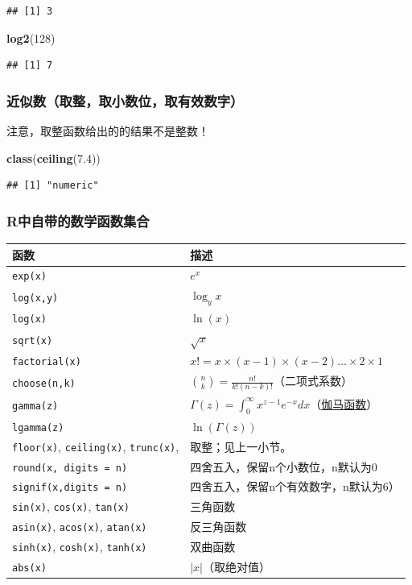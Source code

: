 \documentclass[]{book}
\newenvironment{Shaded}{\begin{snugshade}}{\end{snugshade}}
\newcommand{\DecValTok}[1]{\textcolor[rgb]{0.00,0.00,0.81}{#1}}
\newcommand{\FloatTok}[1]{\textcolor[rgb]{0.00,0.00,0.81}{#1}}
\newcommand{\KeywordTok}[1]{\textcolor[rgb]{0.13,0.29,0.53}{\textbf{#1}}}
\newcommand{\NormalTok}[1]{#1}
\begin{document}
\begin{verbatim}
## [1] 3
\end{verbatim}

\begin{Shaded}
\begin{Highlighting}[]
\KeywordTok{log2}\NormalTok{(}\DecValTok{128}\NormalTok{)}
\end{Highlighting}
\end{Shaded}

\begin{verbatim}
## [1] 7
\end{verbatim}

\hypertarget{quzheng}{%
\subsubsection{近似数（取整，取小数位，取有效数字）}\label{quzheng}}

注意，取整函数给出的的结果不是整数！

\begin{Shaded}
\begin{Highlighting}[]
\KeywordTok{class}\NormalTok{(}\KeywordTok{ceiling}\NormalTok{(}\FloatTok{7.4}\NormalTok{))}
\end{Highlighting}
\end{Shaded}

\begin{verbatim}
## [1] "numeric"
\end{verbatim}

\hypertarget{r}{%
\subsubsection{R中自带的数学函数集合}\label{r}}

\begin{longtable}[]{@{}ll@{}}
\toprule
函数 & 描述\tabularnewline
\midrule
\endhead
\texttt{exp(x)} & \(e^x\)\tabularnewline
\texttt{log(x,y)} & \(\log_yx\)\tabularnewline
\texttt{log(x)} & \(\ln(x)\)\tabularnewline
\texttt{sqrt(x)} & \(\sqrt{x}\)\tabularnewline
\texttt{factorial(x)} & \(x!=x\times(x-1)\times(x-2)\ldots\times2\times1\)\tabularnewline
\texttt{choose(n,k)} & \(\binom{n}{k}=\frac{n!}{k!(n-k)!}\)（二项式系数）\tabularnewline
\texttt{gamma(z)} & \(\Gamma(z)=\int_0^\infty x^{z-1}e^{-x}dx\)（\href{https://en.wikipedia.org/wiki/Gamma_function}{伽马函数}）\tabularnewline
\texttt{lgamma(z)} & \(\ln(\Gamma(z))\)\tabularnewline
\texttt{floor(x)}, \texttt{ceiling(x)}, \texttt{trunc(x)}, & 取整；见上一小节。\tabularnewline
\texttt{round(x,\ digits\ =\ n)} & 四舍五入，保留n个小数位，n默认为0\tabularnewline
\texttt{signif(x,digits\ =\ n)} & 四舍五入，保留n个有效数字，n默认为6）\tabularnewline
\texttt{sin(x)}, \texttt{cos(x)}, \texttt{tan(x)} & 三角函数\tabularnewline
\texttt{asin(x)}, \texttt{acos(x)}, \texttt{atan(x)} & 反三角函数\tabularnewline
\texttt{sinh(x)}, \texttt{cosh(x)}, \texttt{tanh(x)} & 双曲函数\tabularnewline
\texttt{abs(x)} & \(|x|\)（取绝对值）\tabularnewline
\bottomrule
\end{longtable}
\end{document}
